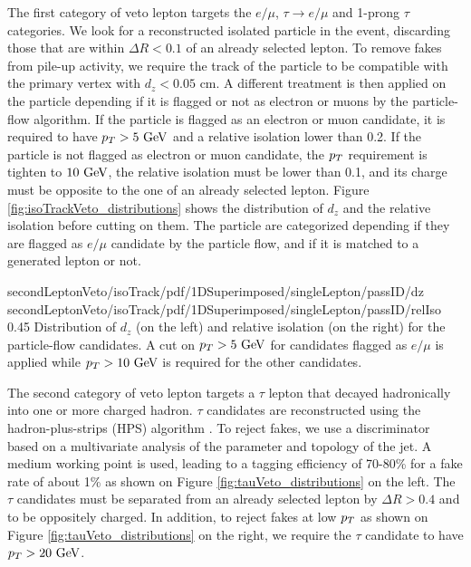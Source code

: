     The first category of veto lepton targets the $e/\mu$, $\tau \rightarrow e/\mu$ and
    1-prong $\tau$ categories. We look for a reconstructed isolated particle in the event, 
    discarding those that are within $\Delta R < 0.1$ of an already selected lepton. To 
    remove fakes from pile-up activity, we require the track of the particle to be 
    compatible with the primary vertex with $d_z < 0.05$ cm. A different treatment is then
    applied on the particle depending if it is flagged or not as electron or muons by the
    particle-flow algorithm. If the particle is flagged as an electron or muon candidate,  
    it is required to have $p_T > 5~\text{GeV}$ and a relative isolation lower than 0.2. 
    If the particle is not flagged as electron or muon candidate, the $p_T$ requirement 
    is tighten to $10~\text{GeV}$, the relative isolation must be lower than 0.1, and its charge 
    must be opposite to the one of an already selected lepton. 
    Figure \ref{fig:isoTrackVeto_distributions} shows the distribution of $d_z$ and the
    relative isolation before cutting on them. The particle are categorized depending if
    they are flagged as $e/\mu$ candidate by the particle flow, and if it is matched to a 
    generated lepton or not.

                     {secondLeptonVeto/isoTrack/pdf/1DSuperimposed/singleLepton/passID/dz}
                     {secondLeptonVeto/isoTrack/pdf/1DSuperimposed/singleLepton/passID/relIso}
                     {0.45}
                     {Distribution of $d_z$ (on the left) and relative isolation (on the right)
                     for the particle-flow candidates. A cut on $p_T > 5~\text{GeV}$ for candidates 
                     flagged as $e/\mu$ is applied while $p_T > 10~\text{GeV}$ is required for 
                     the other candidates.}

    The second category of veto lepton targets a $\tau$ lepton that decayed hadronically 
    into one or more charged hadron. $\tau$ candidates are reconstructed using the 
    hadron-plus-strips (HPS) algorithm . To reject fakes, we use a discriminator 
    based on a multivariate analysis of the parameter and topology of the jet. A medium
    working point is used, leading to a tagging efficiency of 70-80\% for a fake rate of
    about 1\% as shown on Figure \ref{fig:tauVeto_distributions} on the left. The $\tau$
    candidates must be separated from an already selected lepton by $\Delta R > 0.4$ and
    to be oppositely charged. In addition, to reject fakes at low $p_T$ as shown on Figure 
    \ref{fig:tauVeto_distributions} on the right, we require the $\tau$ candidate to have 
    $p_T > 20~\text{GeV}$.

